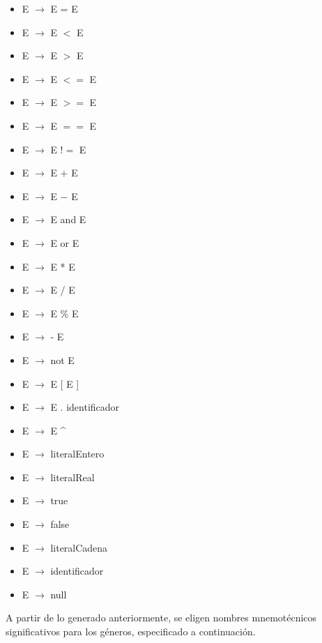 \documentclass[11pt]{article}
\begin{document}
        \begin{itemize}
            \item E $\rightarrow$ E = E
            \item E $\rightarrow$ E $<$ E
            \item E $\rightarrow$ E $>$ E
            \item E $\rightarrow$ E $<=$ E
            \item E $\rightarrow$ E $>=$ E
            \item E $\rightarrow$ E $==$ E
            \item E $\rightarrow$ E $!=$ E
            \item E $\rightarrow$ E $+$ E
            \item E $\rightarrow$ E $-$ E
            \item E $\rightarrow$ E and E
            \item E $\rightarrow$ E or E
            \item E $\rightarrow$ E * E
            \item E $\rightarrow$ E / E
            \item E $\rightarrow$ E \% E
            \item E $\rightarrow$ - E
            \item E $\rightarrow$ not E
            \item E $\rightarrow$ E [ E ]
            \item E $\rightarrow$ E . identificador 
            \item E $\rightarrow$ E \^{}
            \item E $\rightarrow$ literalEntero
            \item E $\rightarrow$ literalReal
            \item E $\rightarrow$ true
            \item E $\rightarrow$ false
            \item E $\rightarrow$ literalCadena
            \item E $\rightarrow$ identificador
            \item E $\rightarrow$ null
        \end{itemize}

        A partir de lo generado anteriormente, se eligen nombres mnemotécnicos significativos para los géneros, especificado a continuación.
\end{document}
